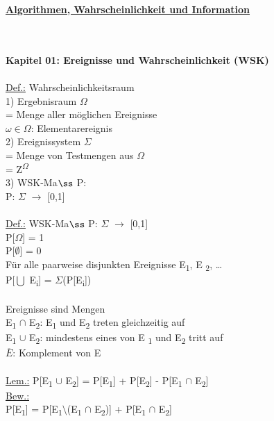 \documentclass{article}
\begin{document}
 \begin{center}
 \textbf{\underline{Algorithmen, Wahrscheinlichkeit und Information}}
 \end{center}
 \hfill \\ \\ 	
 \textbf{Kapitel 01: Ereignisse und Wahrscheinlichkeit (WSK)}
 \\ \\
 \underline{Def.:} Wahrscheinlichkeitsraum \\
 1) Ergebnisraum $\Omega$ \\
 = Menge aller m\"oglichen Ereignisse \\
 $\omega\in\Omega$: Elementarereignis  \\
 2) Ereignissystem $\Sigma$ \\
 = Menge von Testmengen aus $\Omega$ \\
 = Z\textsuperscript{$\Omega$} \\
 3) WSK-Ma$\ss$ P: \\
 P: $\Sigma$ $\to$ [0,1]\\
 \\
 \underline{Def.:} WSK-Ma$\ss$ P: $\Sigma$ $\to$ [0,1]\\
 P[$\Omega$] = 1 \\
 P[$\emptyset$] = 0 \\
 F\"ur alle paarweise disjunkten Ereignisse E\textsubscript{1}, E		\textsubscript{2}, \ldots \\ 	
 P[$\bigcup$ E\textsubscript{i}] = $\Sigma$(P[E\textsubscript{i}]) \\ 	\\
 Ereignisse sind Mengen \\
 E\textsubscript{1}  $\cap$ E\textsubscript{2}: E\textsubscript{1} und E\textsubscript{2} treten gleichzeitig auf \\
 E\textsubscript{1}  $\cup$ E\textsubscript{2}: mindestens eines von E	\textsubscript{1} und E\textsubscript{2} tritt auf \\
 $\overline{E}$: Komplement von E \\
 \\
 \underline{Lem.:} P[E\textsubscript{1} $\cup$ E\textsubscript{2}] = P[E\textsubscript{1}] + P[E\textsubscript{2}] - P[E\textsubscript{1} $\cap$ E\textsubscript{2}] \\
 \underline{Bew.:} \\
 P[E\textsubscript{1}] = P[E\textsubscript{1}$\setminus$(E\textsubscript{1} $\cap$ E\textsubscript{2})] + P[E\textsubscript{1} $\cap$ E\textsubscript{2}] \\ 
\end{document}
